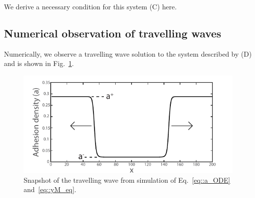 We derive a necessary condition for this system (C) here. 
\subsection{Numerical observation of travelling waves} Numerically, we observe a travelling wave solution  to the system described by (D) and is shown in Fig.~\ref{fig::A_wave}.
\begin{figure}[h]
\centering
\captionsetup{width=.9\linewidth}
\includegraphics[width=4.5in]{Project2/figs/A_wave.pdf}
\caption{Snapshot of the travelling wave from simulation of Eq.~\ref{eq::a_ODE} and~\ref{eq::yM_eq}.}
\label{fig::A_wave}
\end{figure}

